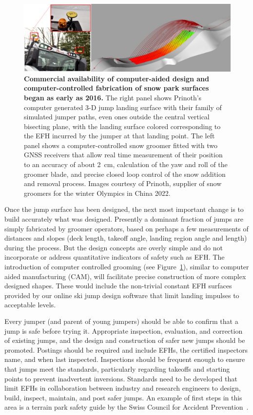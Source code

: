 \documentclass[smallextended]{svjour3}       %
\begin{document}
\begin{figure}
  \centering
  \includegraphics[width=\columnwidth]{figures/prinoth.png}
  \caption{\textbf{Commercial availability of computer-aided design and
    computer-controlled fabrication of snow park surfaces began as early as
    2016.} The right panel shows Prinoth's computer generated 3-D jump landing
    surface with their family of simulated jumper paths, even ones outside the
    central vertical bisecting plane, with the landing surface colored
    corresponding to the EFH incurred by the jumper at that landing point. The
    left panel shows a computer-controlled snow groomer fitted with two GNSS
    receivers that allow real time measurement of their position to an accuracy
    of about 2~\si{\centi\meter}, calculation of the yaw and roll of the
    groomer blade, and precise closed loop control of the snow addition and
    removal process.  Images courtesy of Prinoth, supplier of snow groomers for
  the winter Olympics in China 2022.}
  \label{fig:prinoth}
\end{figure}

Once the jump surface has been designed, the next most important change is to
build accurately what was designed. Presently a dominant fraction of jumps are
simply fabricated by groomer operators, based on perhaps a few measurements of
distances and slopes (deck length, takeoff angle, landing region angle and
length) during the process. But the design concepts are overly simple and do
not incorporate or address quantitative indicators of safety such as EFH. The
introduction of computer controlled grooming (see Figure~\ref{fig:prinoth}),
similar to computer aided manufacturing (CAM), will facilitate precise
construction of more complex designed shapes. These would include the
non-trivial constant EFH surfaces provided by our online ski jump design
software that limit landing impulses to acceptable levels.

Every jumper (and parent of young jumpers) should be able to confirm that a
jump is safe before trying it. Appropriate inspection, evaluation, and
correction of existing jumps, and the design and construction of safer new
jumps should be promoted.  Postings should be required and include EFHs, the
certified inspectors name, and when last inspected.  Inspections should be
frequent enough to ensure that jumps meet the standards, particularly regarding
takeoffs and starting points to prevent inadvertent inversions. Standards need
to be developed that limit EFHs in collaboration between industry and research
engineers to design, build, inspect, maintain, and post safer jumps. An example
of first steps in this area is a terrain park safety guide by the Swiss Council
for Accident Prevention~\cite{Heer2019}.
\end{document}
